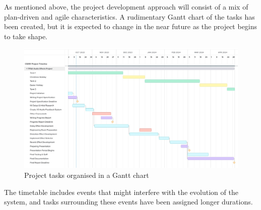 
As mentioned above, the project development approach will consist of a mix of plan-driven and agile characteristics. A rudimentary Gantt chart of the tasks has been created, but it is expected to change in the near future as the project begins to take shape.

% 
\begin{figure}[hb]
\includegraphics[width=1.0\textwidth]{specification/cs351-spec-gantt-chart2.jpeg}
\caption{Project tasks organised in a Gantt chart}
\end{figure}

The timetable includes events that might interfere with the evolution of the system, and tasks surrounding these events have been assigned longer durations.
